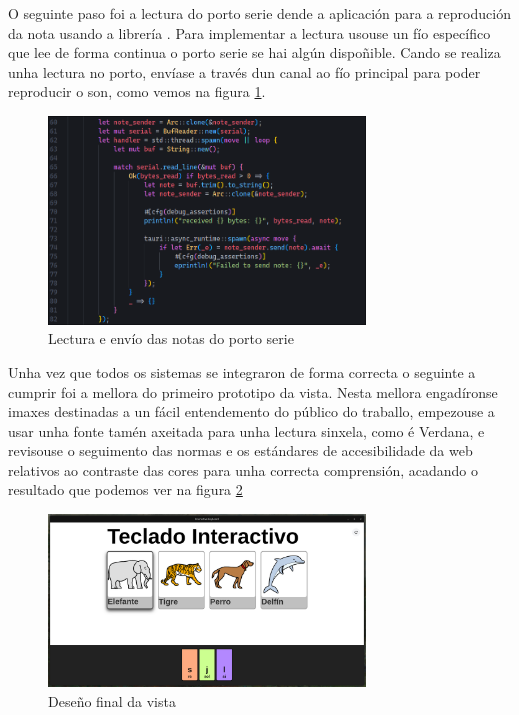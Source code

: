 O seguinte paso foi a lectura do porto serie dende a aplicación para a reprodución da nota usando a librería \cite{Serialport}. Para implementar a lectura usouse un fío específico que lee de forma continua o porto serie se hai algún dispoñible. Cando se realiza unha lectura no porto, envíase a través dun canal ao fío principal para poder reproducir o son, como vemos na figura \ref{fig:sender}.  

\begin{figure}[hp!]
  \centering
  \includegraphics[width=0.75\textwidth]{imaxes/sender.png}
  \caption{Lectura e envío das notas do porto serie}
  \label{fig:sender}
\end{figure}

Unha vez que todos os sistemas se integraron de forma correcta o seguinte a cumprir foi a mellora do primeiro prototipo da vista. Nesta mellora engadíronse imaxes destinadas a un fácil entendemento do público do traballo, empezouse a usar unha fonte tamén axeitada para unha lectura sinxela, como é Verdana, e revisouse o seguimento das normas e os estándares de accesibilidade da web relativos ao contraste das cores para unha correcta comprensión, acadando o resultado que podemos ver na figura \ref{fig:app}

\begin{figure}[hp!]
  \centering
  \includegraphics[width=0.75\textwidth]{imaxes/app.png}
  \caption{Deseño final da vista}
  \label{fig:app}
\end{figure}

